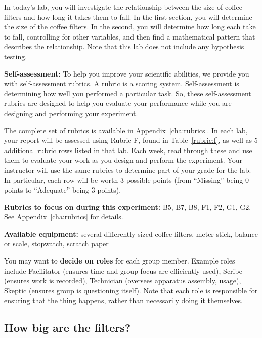 In today's lab, you will investigate the relationship between the size of coffee filters and how long it takes them to fall. In the first section, you will determine the size of the coffee filters. In the second, you will determine how long each take to fall, controlling for other variables, and then find a mathematical pattern that describes the relationship. Note that this lab does not include any hypothesis testing.

\begin{framed}
	\textbf{Self-assessment:} To help you improve your scientific abilities, we provide you with self-assessment rubrics.
	A rubric is a scoring system.
	Self-assessment is determining how well you performed a particular task.
	So, these self-assessment rubrics are designed to help you evaluate your performance while you are designing and performing your experiment.
	
	The complete set of rubrics is available in Appendix~\ref{cha:rubrics}.
	In each lab, your report will be assessed using Rubric F, found in Table~\ref{rubric:f}, as well as 5 additional rubric rows listed in that lab.
	Each week, read through these and use them to evaluate your work as you design and perform the experiment.
	Your instructor will use the same rubrics to determine part of your grade for the lab. In particular, each row will be worth 3 possible points (from ``Missing'' being 0 points to ``Adequate'' being 3 points).
\end{framed}	

\textbf{Rubrics to focus on during this experiment:} B5, B7, B8, F1, F2, G1, G2. See Appendix~\ref{cha:rubrics} for details.

\textbf{Available equipment:} several differently-sized coffee filters, meter stick, balance or scale, stopwatch, scratch paper%

You may want to \textbf{decide on roles} for each group member. Example roles include Facilitator (ensures time and group focus are efficiently used), Scribe (ensures work is recorded), Technician (oversees apparatus assembly, usage), Skeptic (ensures group is questioning itself). Note that each role is responsible for ensuring that the thing happens, rather than necessarily doing it themselves.

\subsection{How big are the filters?}

